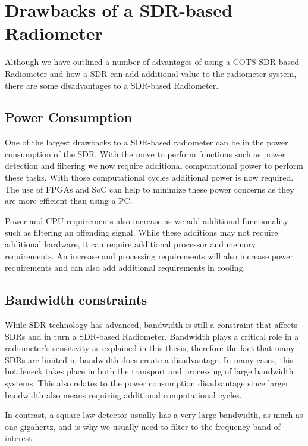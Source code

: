 \section{Drawbacks of a SDR-based Radiometer}
Although we have outlined a number of advantages of using a COTS SDR-based Radiometer and how a SDR can add additional value to the radiometer system, there are some disadvantages to a SDR-based Radiometer.

\subsection{Power Consumption}
One of the largest drawbacks to a SDR-based radiometer can be in the power consumption of the SDR.  With the move to perform functions such as power detection and filtering we now require additional computational power to perform these tasks.  With those computational cycles additional power is now required.  The use of FPGAs and SoC can help to minimize these power concerns as they are more efficient than using a PC.  

Power and CPU requirements also increase as we add additional functionality such as filtering an offending signal.  While these additions may not require additional hardware, it can require additional processor and memory requirements.  An increase and processing requirements will also increase power requirements and can also add additional requirements in cooling.

\subsection{Bandwidth constraints}
While SDR technology has advanced, bandwidth is still a constraint that affects SDRs and in turn a SDR-based Radiometer.  Bandwidth plays a critical role in a radiometer's sensitivity as explained in this thesis, therefore the fact that many SDRs are limited in bandwidth does create a disadvantage.  In many cases, this bottleneck takes place in both the transport and processing of large bandwidth systems.  This also relates to the power consumption disadvantage since larger bandwidth also means requiring additional computational cycles.

In contrast, a square-law detector usually has a very large bandwidth, as much as one gigahertz, and is why we usually need to filter to the frequency band of interest.  


